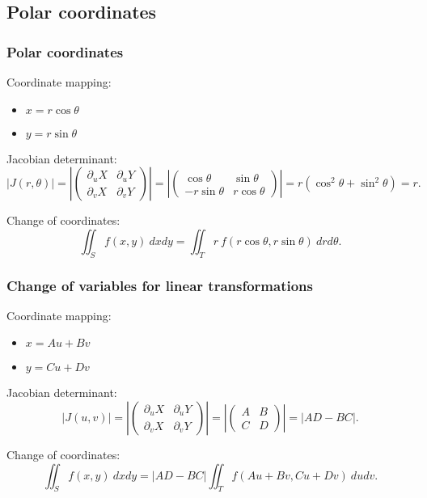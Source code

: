 \documentclass[aspectratio=169,handout]{beamer}
\newcommand{\abs}[1]{\left|#1\right|} %
\begin{document}
\subsection{Polar coordinates}

\begin{frame}
    \frametitle{Polar coordinates}

    Coordinate mapping:
    \begin{itemize}
        \item  \(x = r \cos \theta\)
        \item  \(y = r \sin \theta\)
    \end{itemize}

    Jacobian determinant:
    \[
        \abs{J(r,\theta)}
        = 
        \abs{\begin{pmatrix}
        \partial_u X & \partial_u Y \\ \partial_v X & \partial_v Y
        \end{pmatrix}}
        = 
        \abs{\begin{pmatrix}
        \cos \theta & \sin \theta \\ -r\sin \theta & r\cos \theta
        \end{pmatrix}}
        = r ( \cos^2\theta + \sin^2 \theta) = r.
    \]

    Change of coordinates:
    \[
        \iint_{S} f(x,y) \ dxdy = \iint_{T}  r  \ f(r\cos \theta, r\sin \theta)  \ drd\theta.
    \]

\end{frame}


\begin{frame}
    \frametitle{Change of variables for linear transformations}

     Coordinate mapping:
     \begin{itemize}
         \item \(x = Au + Bv\)
         \item \(y = Cu + Dv\)
     \end{itemize}


     Jacobian determinant:
     \[
         \abs{J(u,v)}
         = 
         \abs{\begin{pmatrix}
         \partial_u X & \partial_u Y \\ \partial_v X & \partial_v Y
         \end{pmatrix}}
         = 
         \abs{\begin{pmatrix}
         A & B \\ C & D
         \end{pmatrix}}
         = \abs{AD - BC}.
     \]
 
     Change of coordinates:
     \[
         \iint_{S} f(x,y) \ dxdy = \abs{AD - BC} \iint_{T}   f(Au + Bv,Cu + Dv)  \ dudv.
     \]
\end{frame}
\end{document}
